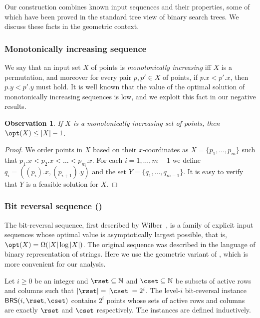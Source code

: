 \documentclass{toc}
\newtheorem{myobs}[theorem]{Observation}
\begin{document}
Our construction combines known input sequences and their properties, some of which have been proved in the standard tree view of binary search trees.  We discuss these facts in the geometric context. 

 \subsubsection{Monotonically increasing sequence} 
 
 We say that an input set $X$ of points is \emph{monotonically increasing} iff $X$ is a permutation, and moreover for every pair $p,p'\in X$ of points, if $p.x <p'.x$, then $p.y<p'.y$ must hold.
It is well known that the value of the optimal solution of monotonically increasing sequences is low, and we exploit this fact in our negative results.
%

\begin{myobs}\label{obs: solution for monotone increasing set}
        If $X$ is a monotonically increasing set of points, then $\opt(X)\leq |X|-1$.
\end{myobs}
 \begin{proof}
We order points in $X$ based on their $x$-coordinates as $X = \{p_1,\ldots, p_m\}$ such that $p_1.x < p_2.x <\ldots < p_m.x$.
For each $i =1,\ldots, m-1$ we define $q_i = ((p_i).x, (p_{i+1}).y)$ and the set $Y = \{q_1,\ldots, q_{m-1}\}$. It is easy to verify that $Y$ is a feasible solution for $X$. 
 \end{proof}



\subsubsection{Bit reversal sequence (\BRS)} 


The bit-reversal sequence, first described by Wilber~\cite{wilber}, is a family of explicit input sequences whose optimal value is asymptotically largest possible, that is, $\opt(X) = \Omega(|X| \log |X|)$. 
The original sequence was described in the language of binary representation of strings. Here we use the geometric variant of \BRS, which is more convenient for our analysis. 

Let $i \geq 0$ be an integer and  $\rset \subseteq {\mathbb N}$ and $\cset \subseteq {\mathbb N}$ be subsets of active rows and columns such that  $|\rset|=|\cset|=2^i$. 
The level-$i$ bit-reversal instance ${\sf BRS}(i,\rset,\cset)$ contains $2^i$ points whose sets of active rows and columns are exactly $\rset$ and $\cset$ respectively. 
The instances are defined inductively. 
\end{document}
